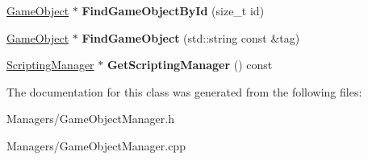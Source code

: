 \begin{DoxyCompactItemize}
\hyperlink{classGameObject}{Game\+Object} $\ast$ {\bfseries Find\+Game\+Object\+By\+Id} (size\+\_\+t id)
\item 
\mbox{\label{classGameObjectManager_adeda63433f7f441ad4d48fc4b9758444}} 
\hyperlink{classGameObject}{Game\+Object} $\ast$ {\bfseries Find\+Game\+Object} (std\+::string const \&tag)
\item 
\mbox{\label{classGameObjectManager_a28a54b6450a5e24621dd582d6bee3f1a}} 
\hyperlink{classScriptingManager}{Scripting\+Manager} $\ast$ {\bfseries Get\+Scripting\+Manager} () const
\end{DoxyCompactItemize}


The documentation for this class was generated from the following files\+:\begin{DoxyCompactItemize}
\item 
Managers/Game\+Object\+Manager.\+h\item 
Managers/Game\+Object\+Manager.\+cpp\end{DoxyCompactItemize}

